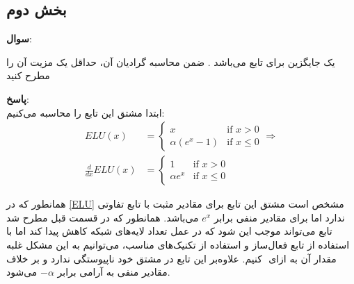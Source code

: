 \documentclass{article}
\begin{document}
	\subsection{بخش دوم}
	{\large \textbf{سوال}:} 
	
	یک جایگزین برای 
	تابع
	می‌باشد . ضمن محاسبه گرادیان آن، حداقل یک مزیت آن را مطرح کنید
	
	{\large \textbf{پاسخ}:} 
	\\ابتدا مشتق این تابع را محاسبه می‌کنیم:
	\begin{align}
		\label{ELU}
		ELU(x) &=
		\begin{cases}
			x & \text{if } x > 0 \\
			\alpha(e^x - 1) & \text{if } x \leq 0
		\end{cases} 
		\Rightarrow \nonumber \\
		\frac{d}{dx} ELU(x) &=
		\begin{cases}
			1 & \text{if } x > 0 \\
			\alpha e^x  & \text{if } x \leq 0
		\end{cases}
	\end{align}
	
	همانطور که در 
	\autoref{ELU}
	مشخص است مشتق این تابع برای مقادیر مثبت با تابع
	تفاوتی ندارد اما برای مقادیر منفی برابر 
	$e^x$
	می‌باشد. همانطور که در قسمت قبل مطرح شد تابع
	می‌تواند موجب این شود که در عمل تعداد لایه‌های شبکه کاهش پیدا کند اما با استفاده از تابع فعال‌ساز
	و استفاده از تکنیک‌های مناسب، می‌توانیم به این مشکل غلبه کنیم. علاوه‌بر این تابع
	در مشتق خود ناپیوستگی ندارد و  بر خلاف 
	‎
	مقدار آن به ازای مقادیر منفی به آرامی برابر 
	$-\alpha$
	می‌شود.‎\cite{ml-cheatsheet-activation-functions}‎ 
	
\end{document}
